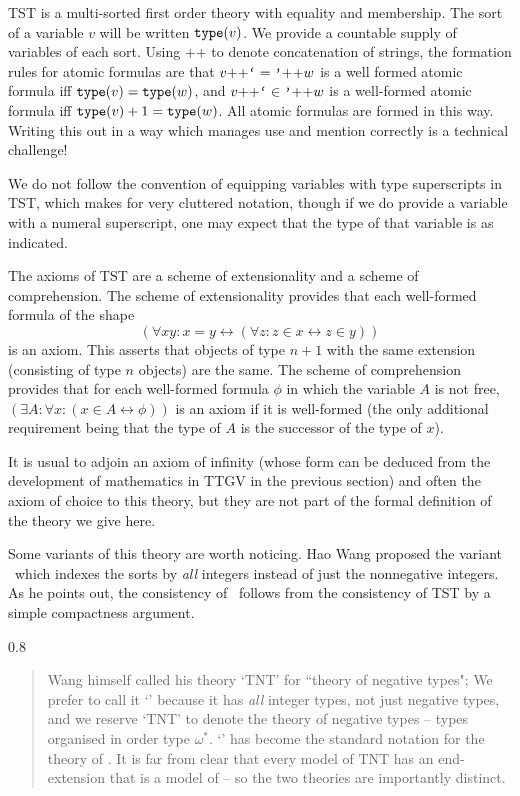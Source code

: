 \documentclass[12pt]{article}
\renewcommand{\smallpara}[1]{\begin{footnotesize}\begin{spacing}{0.8}\begin{quote} #1  \end{quote}\end{spacing}\end{footnotesize}}
\begin{document}
TST is a multi-sorted first order theory with equality and membership.  The sort of a variable $v$ will be written ${\tt type}(v)$.  We provide a countable supply of variables of each sort.  Using ++ to denote concatenation of strings, the formation rules for atomic formulas are that $v{\tt ++}\verb|`|=\verb|'|{\tt ++}w$ is a well formed atomic formula iff ${\tt type}(v)={\tt type}(w)$, and 
$v{\tt ++}\verb|`|\in\verb|'|{\tt ++}w$ is a well-formed atomic formula iff ${\tt type}(v)+1 ={\tt type}(w)$.  All atomic formulas are formed in this way.  Writing this out in a way which manages use and mention correctly is a technical challenge!

We do not follow the convention of equipping variables with type superscripts in TST, which makes for very cluttered notation, though if we do provide a variable with a numeral superscript, one may expect that the type of that variable is as indicated.

The axioms of TST are a scheme of extensionality and a scheme of comprehension.  The scheme of extensionality provides that each well-formed formula of the shape $$(\forall xy:x=y \leftrightarrow (\forall z:z\in x \leftrightarrow z \in y))$$ is an axiom.  This asserts that objects of type $n+1$ with the same extension (consisting of type $n$ objects) are the same.  The scheme of comprehension provides that for each well-formed formula $\phi$ in which the variable $A$ is not free, 
$(\exists A:\forall x:(x \in A \leftrightarrow \phi))$ is an axiom if it is well-formed (the only additional requirement being that the type of $A$ is the successor of the type of $x$).

It is usual to adjoin an axiom of infinity (whose form can be deduced from the development of mathematics in TTGV in the previous section) and often the axiom of choice to this theory, but they are not part of the formal definition of the theory we give here.

Some variants of this theory are worth noticing.  Hao Wang \cite{wang}
proposed the variant \TZT\ which indexes the sorts by {\sl all} integers
instead of just the nonnegative integers.  As he points out, the consistency of \TZT\
follows from the consistency of TST by a simple compactness argument.
\smallpara{Wang himself called his theory `TNT'
  for ``theory of negative types"; We prefer to call it `\TZT' because
  it has {\sl all} integer types, not just negative types, and we reserve
  `TNT' to denote the theory of negative types -- types organised in
  order type $\omega^*$. `\TZT' has become the standard notation for
  the theory of \cite{wang}.  It is far from clear that every model of
  TNT has an end-extension that is a model of \TZT -- so the two
  theories are importantly distinct. }
\end{document}
